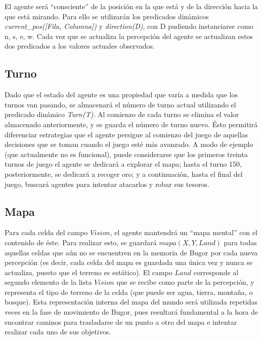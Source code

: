 \documentclass[a4paper,10pt,spanish]{article}
\begin{document}
	El agente ser\'a ``consciente'' de la posici\'on en la que est\'a y de la direcci\'on hacia la que est\'a mirando. Para ello se utilizar\'an los predicados din\'amicos \emph{current\_pos([Fila, Columna])} y \emph{direction(D)}, con D pudiendo instanciarse como n, s, e, w. Cada vez que se actualiza la percepci\'on del agente se actualizan estos dos predicados a los valores actuales observados.
	
	\subsection{Turno}
	
	Dado que el estado del agente es una propiedad que var\'ia a medida que los turnos van pasando, se almacenar\'a el n\'umero de turno actual utilizando el predicado din\'amico \emph{Turn(T)}. Al comienzo de cada turno se elimina el valor almacenado anteriormente, y se guarda el n\'umero de turno nuevo. \'Esto permitir\'a diferenciar estrategias que el agente persigue al comienzo del juego de aquellas decisiones que se toman cuando el juego est\'e m\'as avanzado. A modo de ejemplo (que actualmente no es funcional), puede considerarse que los primeros treinta turnos de juego el agente se dedicar\'a a explorar el mapa; hasta el turno 150, posteriormente, se dedicar\'a a recoger oro; y a continuaci\'on, hasta el final del juego, buscar\'a agentes para intentar atacarlos y robar sus tesoros.
	
	\subsection{Mapa}
	
	Para cada celda del campo $Vision$, el agente mantendr\'a un ``mapa mental'' con el contenido de \'este. Para realizar esto, se guardar\'a $mapa(X, Y, Land)$ para todas aquellas celdas que a\'un no se encuentren en la memoria de Bugor por cada nueva percepci\'on (es decir, cada celda del mapa es guardada una \'unica vez y nunca se actualiza, puesto que el terreno es est\'atico). El campo $Land$ corresponde al segundo elemento de la lista $Vision$ que se recibe como parte de la percepci\'on, y representa el tipo de terreno de la celda (que puede ser agua, tierra, monta\~na, o bosque). Esta representaci\'on interna del mapa del mundo ser\'a utilizada repetidas veces en la fase de movimiento de Bugor, pues resultar\'a fundamental a la hora de encontrar caminos para trasladarse de un punto a otro del mapa e intentar realizar cada uno de sus objetivos.
	
\end{document}
